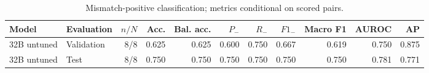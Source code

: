 \begin{table}[htbp]
\centering
\caption{Mismatch-positive classification; metrics conditional on scored pairs.}
\label{tab:pilot32-metrics}
\small
\begin{adjustbox}{max width=\textwidth}
\begin{tabular}{llrrrrrrrrr}
\toprule
Model & Evaluation & $n/N$ & Acc. & Bal. acc. & $P_-$ & $R_-$ & $F1_-$ & Macro F1 & AUROC & AP \\
\midrule
32B untuned & Validation & 8/8 & 0.625 & 0.625 & 0.600 & 0.750 & 0.667 & 0.619 & 0.750 & 0.875 \\
32B untuned & Test & 8/8 & 0.750 & 0.750 & 0.750 & 0.750 & 0.750 & 0.750 & 0.781 & 0.771 \\
\bottomrule
\end{tabular}
\end{adjustbox}
\end{table}
